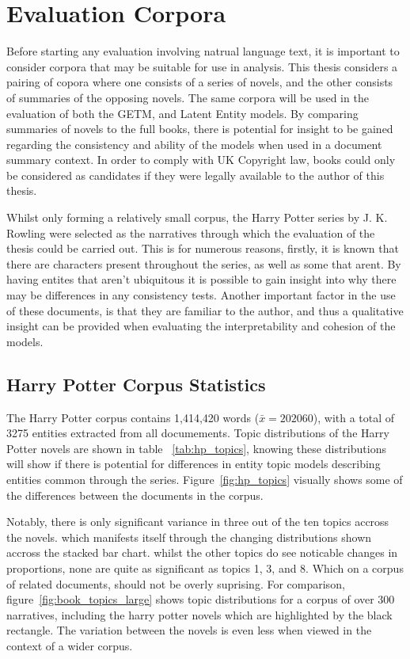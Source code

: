 \documentclass[10pt]{report}
\begin{document}
\section{Evaluation Corpora}
Before starting any evaluation involving natrual language text, it is important to consider corpora that may be suitable for use in analysis. This thesis considers a pairing of copora where one consists of a series of novels, and the other consists of summaries of the opposing novels. The same corpora will be used in the evaluation of both the GETM, and Latent Entity models. By comparing summaries of novels to the full books, there is potential for insight to be gained regarding the consistency and ability of the models when used in a document summary context. In order to comply with UK Copyright law, books could only be considered as candidates if they were legally available to the author of this thesis.

Whilst only forming a relatively small corpus, the Harry Potter series by J. K. Rowling were selected as the narratives through which the evaluation of the thesis could be carried out. This is for numerous reasons, firstly, it is known that there are characters present throughout the series, as well as some that arent. By having entites that aren't ubiquitous it is possible to gain insight into why there may be differences in any consistency tests. Another important factor in the use of these documents, is that they are familiar to the author, and thus a qualitative insight can be provided when evaluating the interpretability and cohesion of the models.

\subsection{Harry Potter Corpus Statistics}

The Harry Potter corpus contains 1,414,420 words ($\bar{x} = 202060$), with a total of 3275 entities extracted from all documements. Topic distributions of the Harry Potter novels are shown in table ~\ref{tab:hp_topics}, knowing these distributions will show if there is potential for differences in entity topic models describing entities common through the series. Figure~\ref{fig:hp_topics} visually shows some of the differences between the documents in the corpus.

Notably, there is only significant variance in three out of the ten topics accross the novels. which manifests itself through the changing distributions shown accross the stacked bar chart. whilst the other topics do see noticable changes in proportions, none are quite as significant as topics 1, 3, and 8. Which on a corpus of related documents, should not be overly suprising. For comparison, figure~\ref{fig:book_topics_large} shows topic distributions for a corpus of over 300 narratives, including the harry potter novels which are highlighted by the black rectangle. The variation between the novels is even less when viewed in the context of a wider corpus.
\end{document}
